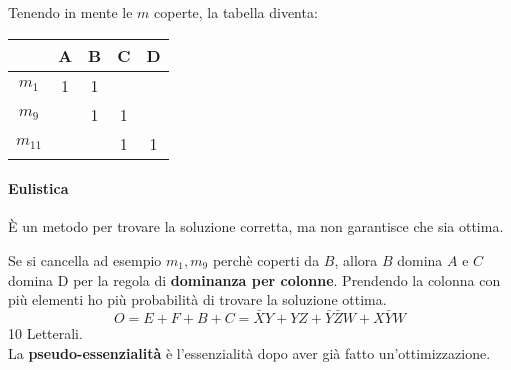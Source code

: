 \documentclass[a4paper]{article}
\theoremstyle{break}
\theoremstyle{break}
\theoremstyle{break}
\theoremstyle{break}
\begin{document}
\begin{example}
Tenendo in mente le \( m \) coperte, la tabella diventa:
\begin{center}
    \begin{tabular}{c|c|c|c|c}
        & A & B & C & D\\
        \hline
        \( m_1 \) & 1 & 1 &  &  \\ 
        \( m_9 \) &  & 1 & 1 &  \\
        \( m_{11} \) &  &  & 1 & 1 \\ 
    \end{tabular}
\end{center}
\paragraph{Eulistica} È un metodo per trovare la soluzione corretta, ma non garantisce
che sia ottima.

Se si cancella ad esempio \( m_1, m_9 \) perchè coperti da \( B \), allora \( B \)
domina \( A \) e \( C \) domina D per la regola di \textbf{dominanza per colonne}.
Prendendo la colonna con più elementi ho più probabilità di trovare la soluzione
ottima.
\[
    O=E+F+B+C = \bar{X}Y+YZ+\bar{Y}\bar{Z}W+X\bar{Y}W
\] 
10 Letterali.\\
La \textbf{pseudo-essenzialità} è l'essenzialità dopo aver già fatto un'ottimizzazione.
\end{example}
\end{document}
